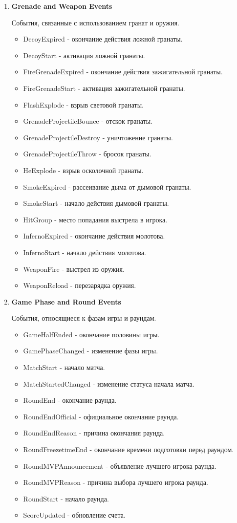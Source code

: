 \begin{enumerate}
	\item \textbf{Grenade and Weapon Events}
	
	События, связанные с использованием гранат и оружия.
	\begin{itemize}
		\item DecoyExpired - окончание действия ложной гранаты.
		\item DecoyStart - активация ложной гранаты.
		\item FireGrenadeExpired - окончание действия зажигательной гранаты.
		\item FireGrenadeStart - активация зажигательной гранаты.
		\item FlashExplode - взрыв световой гранаты.
		\item GrenadeProjectileBounce - отскок гранаты.
		\item GrenadeProjectileDestroy - уничтожение гранаты.
		\item GrenadeProjectileThrow - бросок гранаты.
		\item HeExplode - взрыв осколочной гранаты.
		\item SmokeExpired - рассеивание дыма от дымовой гранаты.
		\item SmokeStart - начало действия дымовой гранаты.
		\item HitGroup - место попадания выстрела в игрока.
		\item InfernoExpired - окончание действия молотова.
		\item InfernoStart - начало действия молотова.
		\item WeaponFire - выстрел из оружия.
		\item WeaponReload - перезарядка оружия.
	\end{itemize}
	
	\item \textbf{Game Phase and Round Events}
	
	События, относящиеся к фазам игры и раундам.
	\begin{itemize}
		\item GameHalfEnded - окончание половины игры.
		\item GamePhaseChanged - изменение фазы игры.
		\item MatchStart - начало матча.
		\item MatchStartedChanged - изменение статуса начала матча.
		\item RoundEnd - окончание раунда.
		\item RoundEndOfficial - официальное окончание раунда.
		\item RoundEndReason - причина окончания раунда.
		\item RoundFreezetimeEnd - окончание времени подготовки перед раундом.
		\item RoundMVPAnnouncement - объявление лучшего игрока раунда.
		\item RoundMVPReason - причина выбора лучшего игрока раунда.
		\item RoundStart - начало раунда.
		\item ScoreUpdated - обновление счета.
	\end{itemize}
	

\end{enumerate}
